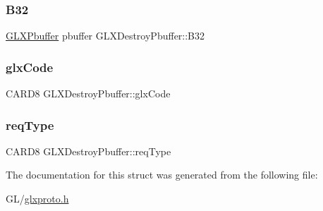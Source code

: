 \subsubsection{\texorpdfstring{B32}{B32}}
{\footnotesize\ttfamily \hyperlink{glx_8h_a0e12899d42d3570d659900a17247cb71}{G\+L\+X\+Pbuffer} pbuffer G\+L\+X\+Destroy\+Pbuffer\+::\+B32}

\mbox{\label{struct_g_l_x_destroy_pbuffer_a9ff7d59613411825f123453b6f14f6e7}} 
\subsubsection{\texorpdfstring{glx\+Code}{glxCode}}
{\footnotesize\ttfamily C\+A\+R\+D8 G\+L\+X\+Destroy\+Pbuffer\+::glx\+Code}

\mbox{\label{struct_g_l_x_destroy_pbuffer_abee425bf043cf7f2dd2a933255376d82}} 
\subsubsection{\texorpdfstring{req\+Type}{reqType}}
{\footnotesize\ttfamily C\+A\+R\+D8 G\+L\+X\+Destroy\+Pbuffer\+::req\+Type}



The documentation for this struct was generated from the following file\+:\begin{DoxyCompactItemize}
\item 
G\+L/\hyperlink{glxproto_8h}{glxproto.\+h}\end{DoxyCompactItemize}
